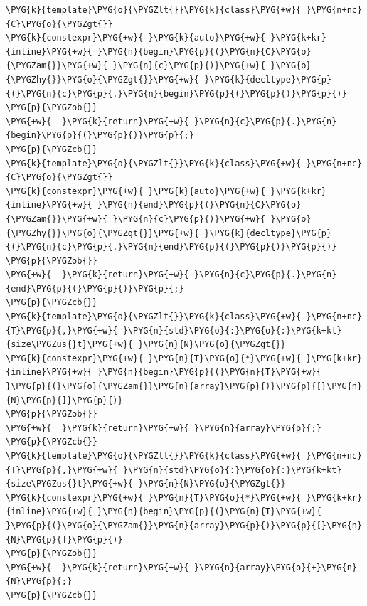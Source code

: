 \begin{codeblockbg}
\begin{Verbatim}[commandchars=\\\{\},breaklines=true,breakanywhere=true,fontsize=\codefont,xleftmargin=17bp]
\PYG{k}{template}\PYG{o}{\PYGZlt{}}\PYG{k}{class}\PYG{+w}{ }\PYG{n+nc}{C}\PYG{o}{\PYGZgt{}}
\PYG{k}{constexpr}\PYG{+w}{ }\PYG{k}{auto}\PYG{+w}{ }\PYG{k+kr}{inline}\PYG{+w}{ }\PYG{n}{begin}\PYG{p}{(}\PYG{n}{C}\PYG{o}{\PYGZam{}}\PYG{+w}{ }\PYG{n}{c}\PYG{p}{)}\PYG{+w}{ }\PYG{o}{\PYGZhy{}}\PYG{o}{\PYGZgt{}}\PYG{+w}{ }\PYG{k}{decltype}\PYG{p}{(}\PYG{n}{c}\PYG{p}{.}\PYG{n}{begin}\PYG{p}{(}\PYG{p}{)}\PYG{p}{)}
\PYG{p}{\PYGZob{}}
\PYG{+w}{  }\PYG{k}{return}\PYG{+w}{ }\PYG{n}{c}\PYG{p}{.}\PYG{n}{begin}\PYG{p}{(}\PYG{p}{)}\PYG{p}{;}
\PYG{p}{\PYGZcb{}}
\PYG{k}{template}\PYG{o}{\PYGZlt{}}\PYG{k}{class}\PYG{+w}{ }\PYG{n+nc}{C}\PYG{o}{\PYGZgt{}}
\PYG{k}{constexpr}\PYG{+w}{ }\PYG{k}{auto}\PYG{+w}{ }\PYG{k+kr}{inline}\PYG{+w}{ }\PYG{n}{end}\PYG{p}{(}\PYG{n}{C}\PYG{o}{\PYGZam{}}\PYG{+w}{ }\PYG{n}{c}\PYG{p}{)}\PYG{+w}{ }\PYG{o}{\PYGZhy{}}\PYG{o}{\PYGZgt{}}\PYG{+w}{ }\PYG{k}{decltype}\PYG{p}{(}\PYG{n}{c}\PYG{p}{.}\PYG{n}{end}\PYG{p}{(}\PYG{p}{)}\PYG{p}{)}
\PYG{p}{\PYGZob{}}
\PYG{+w}{  }\PYG{k}{return}\PYG{+w}{ }\PYG{n}{c}\PYG{p}{.}\PYG{n}{end}\PYG{p}{(}\PYG{p}{)}\PYG{p}{;}
\PYG{p}{\PYGZcb{}}
\PYG{k}{template}\PYG{o}{\PYGZlt{}}\PYG{k}{class}\PYG{+w}{ }\PYG{n+nc}{T}\PYG{p}{,}\PYG{+w}{ }\PYG{n}{std}\PYG{o}{:}\PYG{o}{:}\PYG{k+kt}{size\PYGZus{}t}\PYG{+w}{ }\PYG{n}{N}\PYG{o}{\PYGZgt{}}
\PYG{k}{constexpr}\PYG{+w}{ }\PYG{n}{T}\PYG{o}{*}\PYG{+w}{ }\PYG{k+kr}{inline}\PYG{+w}{ }\PYG{n}{begin}\PYG{p}{(}\PYG{n}{T}\PYG{+w}{ }\PYG{p}{(}\PYG{o}{\PYGZam{}}\PYG{n}{array}\PYG{p}{)}\PYG{p}{[}\PYG{n}{N}\PYG{p}{]}\PYG{p}{)}
\PYG{p}{\PYGZob{}}
\PYG{+w}{  }\PYG{k}{return}\PYG{+w}{ }\PYG{n}{array}\PYG{p}{;}
\PYG{p}{\PYGZcb{}}
\PYG{k}{template}\PYG{o}{\PYGZlt{}}\PYG{k}{class}\PYG{+w}{ }\PYG{n+nc}{T}\PYG{p}{,}\PYG{+w}{ }\PYG{n}{std}\PYG{o}{:}\PYG{o}{:}\PYG{k+kt}{size\PYGZus{}t}\PYG{+w}{ }\PYG{n}{N}\PYG{o}{\PYGZgt{}}
\PYG{k}{constexpr}\PYG{+w}{ }\PYG{n}{T}\PYG{o}{*}\PYG{+w}{ }\PYG{k+kr}{inline}\PYG{+w}{ }\PYG{n}{begin}\PYG{p}{(}\PYG{n}{T}\PYG{+w}{ }\PYG{p}{(}\PYG{o}{\PYGZam{}}\PYG{n}{array}\PYG{p}{)}\PYG{p}{[}\PYG{n}{N}\PYG{p}{]}\PYG{p}{)}
\PYG{p}{\PYGZob{}}
\PYG{+w}{  }\PYG{k}{return}\PYG{+w}{ }\PYG{n}{array}\PYG{o}{+}\PYG{n}{N}\PYG{p}{;}
\PYG{p}{\PYGZcb{}}
\end{Verbatim}
\end{codeblockbg}




